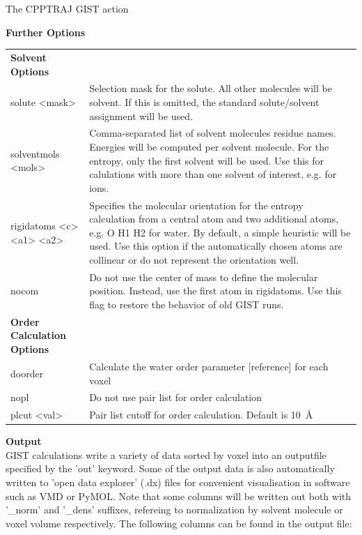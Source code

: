 \documentclass[9pt,tutorial]{livecoms}
\begin{document}
\begin{Checklists*}[h!]
\begin{checklist}{The CPPTRAJ GIST action}
	
\textbf{Further Options}\\
\begin{tabularx}{\textwidth}{@{} l X @{}}
\toprule

\textbf{Solvent Options} &\\
solute <mask> & Selection mask for the solute. All other molecules will be solvent. If this is omitted, the standard solute/solvent assignment will be used. \\
solventmols <mols> &Comma-separated list of solvent molecules residue names. Energies will be computed per solvent molecule. For the entropy, only the first solvent will be used. Use this for calulations with more than one solvent of interest, e.g. for  ions. \\
rigidatoms <c> <a1> <a2> & Specifies the molecular orientation for the entropy calculation from a central atom and two additional atoms, e.g. O H1 H2 for water. By default, a simple heuristic will be used.  
Use this option if the automatically chosen atoms are collinear or do not represent the orientation well. \\
nocom & Do not use the center of mass to define the molecular position. Instead, use the first atom in rigidatoms. Use this flag to restore the behavior of old GIST runs. \\
\textbf{Order Calculation Options} &\\
doorder & Calculate the water order parameter [reference] for each voxel\\
\qquad nopl & Do not use pair list for order calculation\\
\qquad plcut <val> & Pair list cutoff for order calculation. Default is \qty{10}{\angstrom}\\
\bottomrule
\end{tabularx}   
\medskip


\textbf{Output}\\
GIST calculations write a variety of data sorted by voxel into an outputfile specified by the 'out' keyword. 
Some of the output data is also automatically written to 'open data explorer' (.dx) files for convenient visualisation in software such as VMD or PyMOL. Note that some columns will be written out both with '\_norm' and '\_dens' suffixes, refereing to normalization by solvent molecule or voxel volume respectively.
The following columns can be found in the output file:
\medskip



\end{checklist}
\end{Checklists*}
\end{document}
